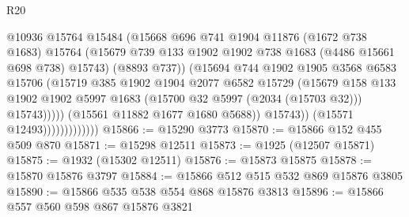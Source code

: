 \begin{lexlean}{R20}
\begin{coremodule}
                                      @10936
                                      @15764
                                      @15484
                                      (@15668
                                        @696
                                        @741
                                        @1904
                                        @11876
                                        (@1672 @738 @1683)
                                        @15764
                                        (@15679
                                          @739
                                          @133
                                          @1902
                                          @1902
                                          @738
                                          @1683
                                          (@4486 @15661 @698 @738)
                                          @15743)
                                        (@8893 @737))
                                      (@15694
                                        @744
                                        @1902
                                        @1905
                                        @3568
                                        @6583
                                        @15706
                                        (@15719
                                          @385
                                          @1902
                                          @1904
                                          @2077
                                          @6582
                                          @15729
                                          (@15679
                                            @158
                                            @133
                                            @1902
                                            @1902
                                            @5997
                                            @1683
                                            (@15700 @32 @5997 (@2034 (@15703 @32)))
                                            @15743)))))
                                  (@15561 @11882 @1677 @1680 @5688))
                                @15743))
                            (@15571 @12493)))))))))))))
@15866 := @15290 @3773
@15870 := @15866 @152 @455 @509 @870
@15871 := @15298 @12511
@15873 := @1925 (@12507 @15871)
@15875 := @1932 (@15302 @12511)
@15876 := @15873 @15875
@15878 := @15870 @15876 @3797
@15884 := @15866 @512 @515 @532 @869 @15876 @3805
@15890 := @15866 @535 @538 @554 @868 @15876 @3813
@15896 := @15866 @557 @560 @598 @867 @15876 @3821

\end{coremodule}
\end{lexlean}
